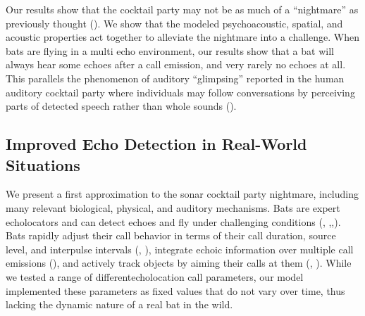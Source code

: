 \documentclass[
]{book}
\begin{document}
Our results show that the cocktail party may not be as much of a ``nightmare'' as previously thought (\citet{ulanovsky2008a}). We show that the modeled psychoacoustic, spatial, and acoustic properties act together to alleviate the nightmare into a challenge. When bats are flying in a multi echo environment, our results show that a bat will always hear some echoes after a call emission, and very rarely no echoes at all. This parallels the phenomenon of auditory ``glimpsing'' reported in the human auditory cocktail party where individuals may follow conversations by perceiving parts of detected speech rather than whole sounds (\citet{miller1950a}).

\hypertarget{improved-echo-detection-in-real-world-situations}{%
\subsection{Improved Echo Detection in Real-World Situations}\label{improved-echo-detection-in-real-world-situations}}

We present a first approximation to the sonar cocktail party nightmare, including many relevant biological, physical, and auditory mechanisms. Bats are expert echolocators and can detect echoes and fly under challenging conditions (\citet{m1989a}, \citet{surlykke1992a},\citet{petrites2009a},\citet{bates2008a}). Bats rapidly adjust their call behavior in terms of their call duration, source level, and interpulse intervals (\citet{luo2017a}, \citet{corcoran2017a}), integrate echoic information over multiple call emissions (\citet{simmons2012a}), and actively track objects by aiming their calls at them (\citet{ghose2006a}, \citet{ghose2006b}). While we tested a range of differentecholocation call parameters, our model implemented these parameters as fixed values that do not vary over time, thus lacking the dynamic nature of a real bat in the wild.
\end{document}
